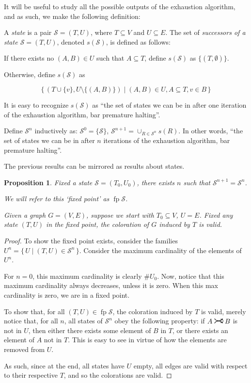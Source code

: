 \documentclass[11pt]{article}
\newcommand{\cS}{\mathcal{S}}
\DeclareMathOperator{\fp}{fp}
\newcommand{\rightcurvearrow}{
\mathrel{
  \begin{tikzpicture}[scale=0.8]
    \draw[thick,->] (0,1ex) arc (30:150:-2ex);
    \draw[thick,->] (0,-1ex) arc (150:30:2ex);
  \end{tikzpicture}
}
}
\newtheorem{prop}{Proposition}
\begin{document}
It will be useful to study all the possible outputs of the exhaustion algorithm, and as such, we make the following definition:

A \emph{state} is a pair $\cS = (T,U)$, where $T \subseteq V$ and $U \subseteq E$. The set of \emph{successors of a state $\cS = (T,U)$}, denoted $s(\cS)$, is defined as follows:

If there exists no $(A,B) \in U$ such that $A \subseteq T$, define $s(\cS)$ as $\{(T, \emptyset)\}$.

Otherwise, define $s(\cS)$ as

\[ \{ \, (T \cup \{v\}, U \setminus \{(A,B)\}) \mid (A,B) \in U, A \subseteq T, v \in B \, \}\]

It is easy to recognize $s(\cS)$ as ``the set of states we can be in after one iteration of the exhaustion algorithm, bar premature halting''.

Define $\cS^n$ inductively as: $\cS^0 = \{\cS\}$, $\cS^{n+1} = \cup_{R \in \cS^n} s(R)$. In other words, ``the set of states we can be in after $n$ iterations of the exhaustion algorithm, bar premature halting''.

The previous results can be mirrored as results about states.

\begin{prop} \label{statesfixedpointvalid}
Fixed a state $\cS = (T_0, U_0)$, there exists $n$ such that $\cS^{n+1} = \cS^n$.

We will refer to this `fixed point' as $\fp \cS$.

Given a graph $G = (V,E)$, suppose we start with $T_0 \subseteq V$, $U = E$. Fixed any state $(T,U)$ in the fixed point, the coloration of $G$ induced by $T$ is valid.
\end{prop}

\begin{proof}
To show the fixed point exists, consider the families $U^n = \{\,U\mid (T,U) \in \cS^n\,\}$. Consider the maximum cardinality of the elements of $U^n$.

For $n = 0$, this maximum cardinality is clearly $\# U_0$. Now, notice that this maximum cardinality always decreases, unless it is zero. When this max cardinality is zero, we are in a fixed point.

To show that, for all $(T,U) \in \fp \cS$, the coloration induced by $T$ is valid, merely notice that, for all $n$, all states of $\cS^n$ obey the following property: if $A \rightcurvearrow B$ is not in $U$, then either there exists some element of $B$ in $T$, or there exists an element of $A$ not in $T$. This is easy to see in virtue of how the elements are removed from $U$.

As such, since at the end, all states have $U$ empty, all edges are valid with respect to their respective $T$, and so the colorations are valid.

\end{proof}
\end{document}
